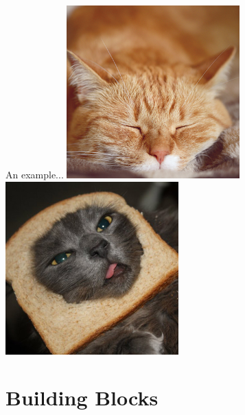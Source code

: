 \documentclass{beamer}
\begin{document}
\begin{frame}{An example...}
\includegraphics[width=0.5\textwidth, height=0.75\textheight]{images/img1.jpg}
\includegraphics[width=0.5\textwidth, height=0.75\textheight]{images/img2.jpg}
\end{frame}

\section{Building Blocks}
\end{document}
